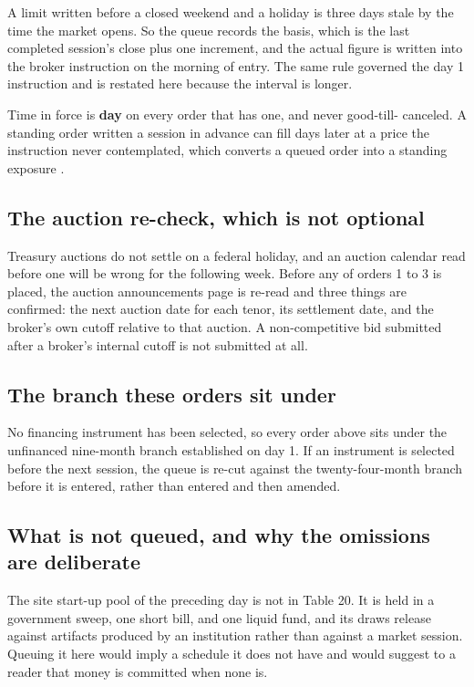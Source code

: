 A limit written before a closed weekend and a holiday is three days stale by the
time the market opens. So the queue records the basis, which is the last
completed session's close plus one increment, and the actual figure is written
into the broker instruction on the morning of entry. The same rule governed the
day 1 instruction and is restated here because the interval is longer.

Time in force is \textbf{day} on every order that has one, and never good-till-
canceled. A standing order written a session in advance can fill days later at a
price the instruction never contemplated, which converts a queued order into a
standing exposure \cite{treasuryauctions2026}.

\subsection{The auction re-check, which is not optional}

Treasury auctions do not settle on a federal holiday, and an auction calendar
read before one will be wrong for the following week. Before any of orders 1 to
3 is placed, the auction announcements page is re-read and three things are
confirmed: the next auction date for each tenor, its settlement date, and the
broker's own cutoff relative to that auction. A non-competitive bid submitted
after a broker's internal cutoff is not submitted at all.

\subsection{The branch these orders sit under}

No financing instrument has been selected, so every order above sits under the
unfinanced nine-month branch established on day 1. If an instrument is selected
before the next session, the queue is re-cut against the twenty-four-month branch
before it is entered, rather than entered and then amended.

\subsection{What is not queued, and why the omissions are deliberate}

The site start-up pool of the preceding day is not in Table 20. It is held in a
government sweep, one short bill, and one liquid fund, and its draws release
against artifacts produced by an institution rather than against a market
session. Queuing it here would imply a schedule it does not have and would
suggest to a reader that money is committed when none is.

